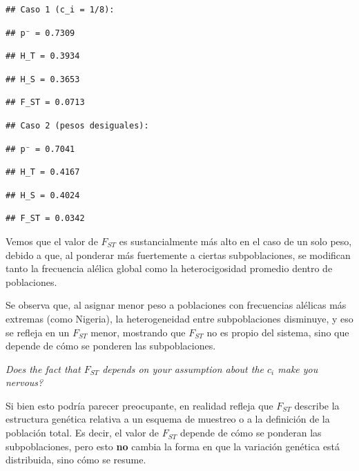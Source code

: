 \documentclass[
  11pt,
]{article}
\begin{document}
\begin{verbatim}
## Caso 1 (c_i = 1/8):
\end{verbatim}

\begin{verbatim}
## p⁻ = 0.7309
\end{verbatim}

\begin{verbatim}
## H_T = 0.3934
\end{verbatim}

\begin{verbatim}
## H_S = 0.3653
\end{verbatim}

\begin{verbatim}
## F_ST = 0.0713
\end{verbatim}

\begin{verbatim}
## Caso 2 (pesos desiguales):
\end{verbatim}

\begin{verbatim}
## p⁻ = 0.7041
\end{verbatim}

\begin{verbatim}
## H_T = 0.4167
\end{verbatim}

\begin{verbatim}
## H_S = 0.4024
\end{verbatim}

\begin{verbatim}
## F_ST = 0.0342
\end{verbatim}

Vemos que el valor de \(F_{ST}\) es sustancialmente más alto en el caso
de un solo peso, debido a que, al ponderar más fuertemente a ciertas
subpoblaciones, se modifican tanto la frecuencia alélica global como la
heterocigosidad promedio dentro de poblaciones.

Se observa que, al asignar menor peso a poblaciones con frecuencias
alélicas más extremas (como Nigeria), la heterogeneidad entre
subpoblaciones disminuye, y eso se refleja en un \(F_{ST}\) menor,
mostrando que \(F_{ST}\) no es propio del sistema, sino que depende de
cómo se ponderen las subpoblaciones.

\emph{Does the fact that \(F_{ST}\) depends on your assumption about the
\(c_i\) make you nervous?}

Si bien esto podría parecer preocupante, en realidad refleja que
\(F_{ST}\) describe la estructura genética relativa a un esquema de
muestreo o a la definición de la población total. Es decir, el valor de
\(F_{ST}\) depende de cómo se ponderan las subpoblaciones, pero esto
\textbf{no} cambia la forma en que la variación genética está
distribuida, sino cómo se resume.
\end{document}
